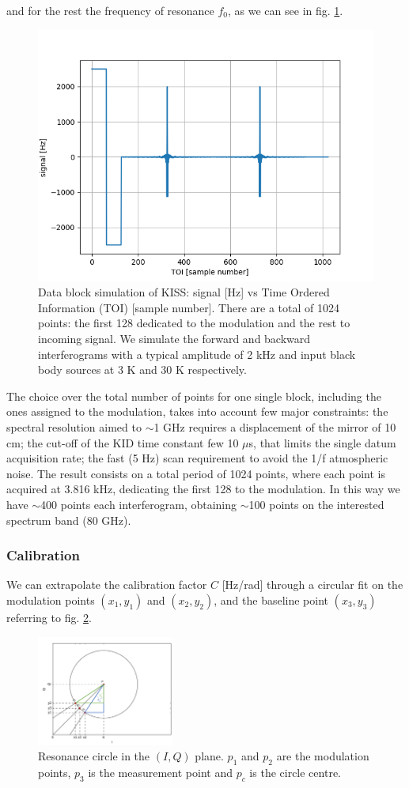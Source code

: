 \documentclass[twocolumn,traditabstract]{aa}\\
\begin{document}
\noindent and for the rest the frequency of resonance $f_0$, as we can see in fig. \ref{fig:mod}.

\begin{figure}[htf]
	\centering
	\includegraphics[width=.5\textwidth]{3.acqui/block_data.png}
	\caption{Data block simulation of KISS: signal [Hz] vs Time Ordered Information (TOI) [sample number]. There are a total of 1024 points: the first 128 dedicated to the modulation and the rest to incoming signal. We simulate the forward and backward interferograms with a typical amplitude of 2 kHz and input black body sources at 3 K and 30 K respectively.}
	\label{fig:mod}
\end{figure}

\noindent The choice over the total number of points for one single block, including the ones assigned to the modulation, takes into account few major constraints: the spectral resolution aimed to $\sim$1 GHz requires a displacement of the mirror of 10 cm; the cut-off of the KID time constant few 10 $\mu$s, that limits the single datum acquisition rate; the fast (5 Hz) scan requirement to avoid the 1/f atmospheric noise. The result consists on a total period of 1024 points, where each point is acquired at 3.816 kHz, dedicating the first 128 to the modulation. In this way we have $\sim$400 points each interferogram, obtaining $\sim$100 points on the interested spectrum band (80 GHz).

\subsubsection{Calibration}
\label{calib}

\noindent We can extrapolate the calibration factor $C$ [Hz/rad] through a circular fit on the modulation points $(x_1,y_1)$ and $(x_2,y_2)$, and the baseline point $(x_3,y_3)$ referring to fig. \ref{fig:IQ_modulation}. 

\begin{figure}[htf]
	\centering
	\includegraphics[width=0.4\textwidth]{3.acqui/circle.png}
	\caption{Resonance circle in the $(I,Q)$ plane. $p_1$ and $p_2$ are the modulation points, $p_3$ is the measurement point and $p_c$ is the circle centre. }
	\label{fig:IQ_modulation}
\end{figure}
\end{document}
